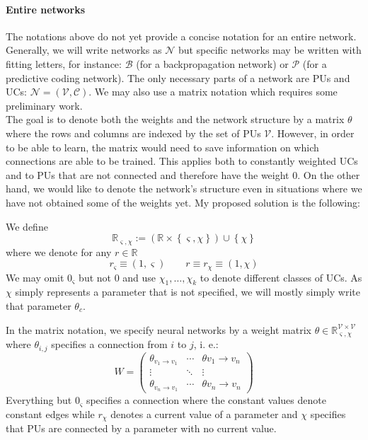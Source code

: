 \documentclass[a4paper,11pt]{article}
\newcommand{\const}{\varsigma}
\newcommand{\var}{\chi}
\begin{document}
\paragraph{Entire networks} The notations above do not yet provide a concise notation for an entire network. Generally, we will write networks as $\mathcal{N}$ but specific networks may be written with fitting letters, for instance: $\mathcal{B}$ (for a backpropagation network) or $\mathcal{P}$ (for a predictive coding network). The only necessary parts of a network are PUs and UCs: $\mathcal{N}=(\mathcal{V},\mathcal{C})$. We may also use a matrix notation which requires some preliminary work.\\
The goal is to denote both the weights and the network structure by a matrix $\theta$ where the rows and columns are indexed by the set of PUs $\mathcal{V}$. However, in order to be able to learn, the matrix would need to save information on which connections are able to be trained. This applies both to constantly weighted UCs and to PUs that are not connected and therefore have the weight $0$. On the other hand, we would like to denote the network's structure even in situations where we have not obtained some of the weights yet. My proposed solution is the following:
\begin{Not}
We define
\begin{equation}
\mathbb{R}_{\const,\var}:=\left(\mathbb{R}\times\left\{\const,\var\right\}\right)\cup\left\{\var\right\}
\end{equation}
where we denote for any $r\in\mathbb{R}$
\begin{equation}
r_{\const}\equiv(1,\const)\qquad r\equiv r_{\var}\equiv(1,\var)
\end{equation}
We may omit $0_{\const}$ but not $0$ and use $\chi_1,\dotsc,\chi_k$ to denote different classes of UCs. As $\chi$ simply represents a parameter that is not specified, we will mostly simply write that parameter $\theta_c$.
\end{Not}
\begin{Abs}
In the matrix notation, we specify neural networks by a weight matrix $\theta\in\mathbb{R}_{\const,\var}^{\mathcal{V}\times\mathcal{V}}$ where $\theta_{i,j}$ specifies a connection from $i$ to $j$, i. e.:
\begin{equation}
W=\begin{pmatrix}
\theta_{v_1\to v_1}&\dotsb&\theta{v_1\to v_n}\\
\vdots&\ddots&\vdots\\
\theta_{v_n\to v_1}&\dotsb&\theta{v_n\to v_n}
\end{pmatrix}
\end{equation}
Everything but $0_{\const}$ specifies a connection where the constant values denote constant edges while $r_{\var}$ denotes a current value of a parameter and $\var$ specifies that PUs are connected by a parameter with no current value.
\end{Abs}
\end{document}
